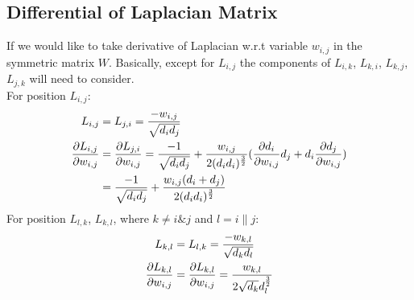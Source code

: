 \documentclass[final]{siamltexmm}
\begin{document}
\subsection{Differential of Laplacian Matrix}
If we would like to take derivative of Laplacian w.r.t variable $w_{i,j}$ in the symmetric matrix $W$. Basically, except for $L_{i,j}$ the components of $L_{i,k}$, $L_{k,i}$, $L_{k,j}$, $L_{j,k}$ will need to consider.\\
For position $L_{i,j}$:
\begin{equation}
\begin{aligned}
L_{i,j} &= L_{j,i} =  {-w_{i,j} \over \sqrt{d_id_j}} \\
{\partial L_{i,j} \over \partial w_{i,j}} &= {\partial L_{j,i} \over \partial w_{i,j}} = {-1 \over \sqrt{d_id_j}} + {w_{i,j} \over 2(d_id_i)^{3\over 2}}({\partial d_i \over \partial w_{i,j}}d_j + d_i{\partial d_j \over \partial w_{i,j}}) \\
&= {-1 \over \sqrt{d_id_j}} + {w_{i,j}(d_i+d_j) \over 2(d_id_i)^{3\over 2}}
\end{aligned}
\end{equation}
For position $L_{l,k}$, $L_{k,l}$, where $k \neq i \& j$ and $l = i\|j$:
\begin{equation}
\begin{aligned}
L_{k,l} &= L_{l,k} =  {-w_{k,l} \over \sqrt{d_kd_l}} \\
{\partial L_{k,l} \over \partial w_{i,j}} &= {\partial L_{k,l} \over \partial w_{i,j}} = {w_{k,l} \over 2\sqrt{d_k}d_l^{3\over2}}
\end{aligned}
\end{equation}
\end{document}

